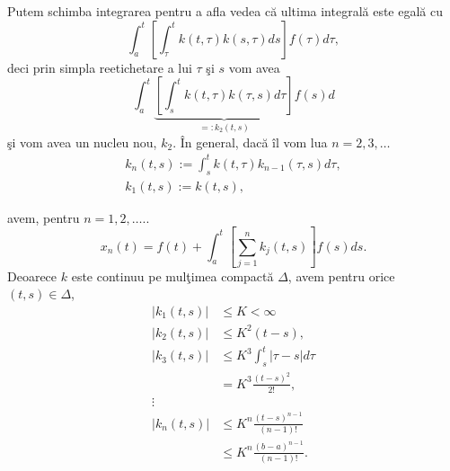 \documentclass[a4paper,12pt,oneside]{report}
\begin{document}
\noindent Putem schimba integrarea pentru a afla vedea c\u{a} ultima integral\u{a} este egal\u{a} cu
\begin{displaymath}
\int_{a}^{t}\left [ \int_{\tau }^{t}k\left ( t,\tau  \right )k\left ( s,\tau  \right )ds \right ]f\left (\tau   \right )d\tau,
\end{displaymath}
deci prin simpla reetichetare a lui  \(\tau\) \c{s}i \(s\) vom avea
\begin{displaymath}
\int_{a}^{t}\underbrace{\left [ \int_{s}^{t}k\left ( t,\tau  \right )k\left ( \tau ,s \right )d\tau  \right ]} _ {=: k_{2}\left ( t,s \right )} f\left ( s \right )d
\end{displaymath}
\c{s}i vom avea un nucleu nou,  \(k_{2}\). \^{I}n general, dac\u{a} \^{i}l vom lua  \(n = 2,3,…\)
\begin{equation} \nonumber
    \begin{split}
       k_{n}\left ( t,s \right ) := \int_{s}^{t}k\left ( t,\tau  \right )k_{n-1}\left ( \tau ,s \right )d\tau, \\
        k_{1}\left ( t,s \right ) := k\left ( t,s \right ),
    \end{split}
\end{equation}

\noindent avem, pentru \(n = 1,2,…..\)
\begin{displaymath}
x_{n}\left ( t \right ) = f\left ( t \right ) + \int_{a}^{t}\left [ \sum_{j= 1}^{n}k_{j}\left ( t,s \right ) \right ]f\left ( s \right )ds. \label{eq:2.6} \tag{2.6}
\end{displaymath}
Deoarece \(k\) este continuu pe mul\c{t}imea compact\u{a} \(\Delta\), avem pentru orice \(\left ( t,s \right ) \in \Delta\),
\begin{equation} \nonumber
    \begin{split}
        \left | k_{1}\left ( t,s \right ) \right |&\leq K < \infty \\
        \left | k_{2}\left ( t,s \right ) \right |&\leq K^{2}\left ( t-s \right ), \\
        \left | k_{3}\left ( t,s \right ) \right | & \leq K^{3}\int_{s}^{t}\left | \tau - s \right |d\tau \\
        & = K^{3}\frac{\left ( t-s \right )^{2}}{2!}, \\
        \vdots \\
        \left | k_{n}\left ( t,s \right ) \right | & \leq K^{n}\frac{\left ( t-s \right )^{n-1}}{\left ( n-1 \right )!} \\ & \leq K^{n}\frac{\left ( b-a \right )^{n-1}}{\left ( n-1 \right )!}.
    \end{split}
\end{equation}
\end{document}
